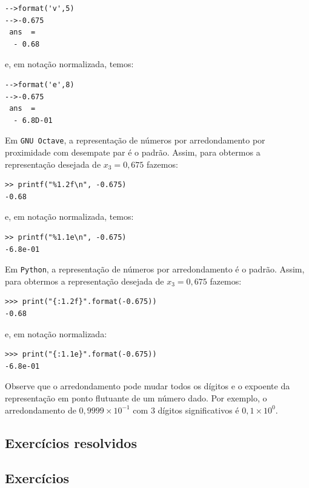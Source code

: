 \begin{sol}
\begin{itemize}
\begin{verbatim}
-->format('v',5)
-->-0.675
 ans  =
  - 0.68
\end{verbatim}
e, em notação normalizada, temos:
\begin{verbatim}
-->format('e',8)
-->-0.675
 ans  =
  - 6.8D-01
\end{verbatim}
\fi
\ifisoctave
Em \verb+GNU Octave+, a representação de números por arredondamento por proximidade com desempate par é o padrão. Assim, para obtermos a representação desejada de $x_3 = 0,675$ fazemos:
\begin{verbatim}
>> printf("%1.2f\n", -0.675)
-0.68
\end{verbatim}
e, em notação normalizada, temos:
\begin{verbatim}
>> printf("%1.1e\n", -0.675)
-6.8e-01
\end{verbatim}
\fi
\ifispython
Em \verb+Python+, a representação de números por arredondamento é o padrão. Assim, para obtermos a representação desejada de $x_3 = 0,675$ fazemos:
\begin{verbatim}
>>> print("{:1.2f}".format(-0.675))
-0.68
\end{verbatim}
e, em notação normalizada:
\begin{verbatim}
>>> print("{:1.1e}".format(-0.675))
-6.8e-01
\end{verbatim}
\fi
  \end{itemize}
\end{sol}

\begin{obs}
  Observe que o arredondamento pode mudar todos os dígitos e o expoente da representação em ponto flutuante de um número dado. Por exemplo, o arredondamento de $0,9999\times 10^{-1}$ com $3$ dígitos significativos é $0,1\times 10^{0}$.
\end{obs}

\subsection*{Exercícios resolvidos}

\construirExeresol

\subsection*{Exercícios}

